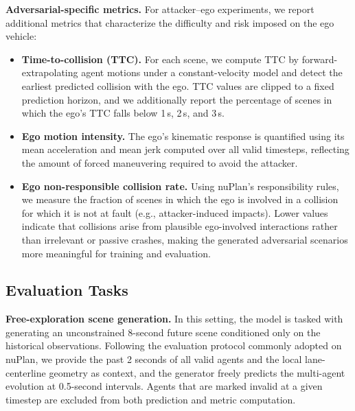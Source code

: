 \documentclass[10pt,twocolumn,letterpaper]{article}
\theoremstyle{plain}
\theoremstyle{remark}
\renewcommand{\paragraph}[1]{\vspace{.5em}\noindent\textbf{#1.}}
\begin{document}
\paragraph{Adversarial-specific metrics}
For attacker–ego experiments, we report additional metrics that
characterize the difficulty and risk imposed on the ego vehicle:

\begin{itemize}
    \item \textbf{Time-to-collision (TTC).}  
    For each scene, we compute TTC by forward-extrapolating agent
    motions under a constant-velocity model and detect the earliest
    predicted collision with the ego.  
    TTC values are clipped to a fixed prediction horizon, and we
    additionally report the percentage of scenes in which the ego’s TTC falls below 1\,s, 2\,s, and 3\,s.

    \item \textbf{Ego motion intensity.}  
    The ego’s kinematic response is quantified using its mean
    acceleration and mean jerk computed over all valid timesteps,
    reflecting the amount of forced maneuvering required to avoid
    the attacker.

    \item \textbf{Ego non-responsible collision rate.}  
    Using nuPlan’s responsibility rules, we measure the fraction of
    scenes in which the ego is involved in a collision for which it
    is not at fault (e.g., attacker-induced impacts).  
    Lower values indicate that collisions arise from plausible
    ego-involved interactions rather than irrelevant or
    passive crashes, making the generated adversarial scenarios
    more meaningful for training and evaluation.
\end{itemize}


\subsection{Evaluation Tasks}
\paragraph{Free-exploration scene generation}
In this setting, the model is tasked with generating an
unconstrained 8-second future scene conditioned only on the
historical observations.  
Following the evaluation protocol commonly adopted on nuPlan, we
provide the past 2 seconds of all valid agents and the local
lane-centerline geometry as context, and the generator freely
predicts the multi-agent evolution at 0.5-second intervals.
Agents that are marked invalid at a given timestep are excluded
from both prediction and metric computation.
\end{document}
